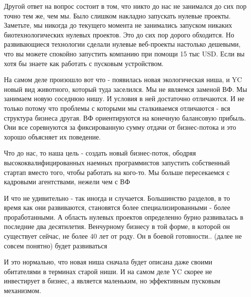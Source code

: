 \documentclass[ebook,12pt,oneside,openany]{memoir}
\begin{document}
Другой ответ на вопрос состоит в том, что никто до нас не занимался до
сих пор точно тем же, чем мы. Было слишком накладно запускать нулевые
проекты. Заметьте, мы никогда до текущего момента не занимались
запуском никаких биотехнологических нулевых проектов. Это до сих пор
дорого обходится. Но развивающиеся технологии сделали нулевые
веб-проекты настолько дешевыми, что вы можете спокойно запустить
компанию при помощи 15 тыс USD. Если вы хотя бы знаете как работать с
пусковым устройством.

На самом деле произошло вот что - появилась новая экологическая ниша,
и YC новый вид животного, который туда заселился. Мы не являемся
заменой ВФ. Мы занимаем новую соседнюю нишу. И условия в ней
достаточно отличаются. И не только потому что проблемы с которыми мы
сталкиваемся отличаются - вся структура бизнеса другая. ВФ
ориентируются на конечную балансовую прибыль. Они все соревнуются за
фиксированную сумму отдачи от бизнес-потока и это хорошо объясняет их
поведение.

Что до нас, то наша цель - создать новый бизнес-поток, ободряя
высококвалифицированных наемных программистов запустить собственный
стартап вместо того, чтобы работать на кого-то. Мы больше пересекаемся
с кадровыми агентствами, нежели чем с ВФ

И что не удивительно - так иногда и случается. Большинство разделов, в
то время как они развиваются, становятся более специализированными -
более проработанными. А область нулевых проектов определенно бурно
развивалась в последние два десятилетия. Венчурному бизнесу в той
форме, в которой он существует сейчас, не более 40 лет от роду. Он в
боевой готовности.. (далее не совсем понятно) будет развиваться

И это нормально, что новая ниша сначала будет описана даже своими
обитателями в терминах старой ниши. И на самом деле YC скорее не
инвестирует в бизнес, а является маленьким, но эффективным пусковым
механизмом.
\end{document}

